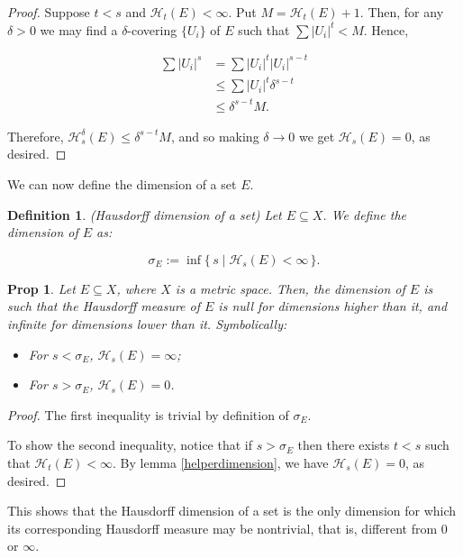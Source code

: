 \documentclass[11pt, reqno]{amsart}
\newcommand{\HH}{\mathcal{H}}
\newtheorem{prop}{Prop}
\newtheorem{definition}{Definition}
\begin{document}
\begin{proof}
Suppose $t < s$ and $\HH_t(E) < \infty$. Put $M = \HH_t(E) + 1$. Then, for any $\delta > 0$ we may find a $\delta$-covering $\{U_i\}$ of $E$ such that $\sum \lvert U_i \rvert^t < M$. Hence, 

\begin{align*}
\sum \lvert U_i \rvert^s &= \sum \lvert U_i \rvert^t \lvert U_i \rvert^{s - t}\\
&\leq \sum \lvert U_i \rvert^t \delta^{s-t}\\
&\leq \delta^{s-t} M.
\end{align*}

Therefore, $\HH_s^\delta(E) \leq \delta^{s-t} M$, and so making $\delta \to 0$ we get $\HH_s(E) = 0$, as desired.
\end{proof}

We can now define the dimension of a set $E$.

\begin{definition} (Hausdorff dimension of a set) Let $E \subseteq X$. We define the dimension of $E$ as:

\[\sigma_E := \inf \{\, s \mid \HH_s(E) < \infty \,\}.\]
\end{definition}

\begin{prop}
Let $E \subseteq X$, where $X$ is a metric space. Then, the dimension of $E$ is such that the Hausdorff measure of $E$ is null for dimensions higher than it, and infinite for dimensions lower than it. Symbolically:

\begin{itemize}
\item For $s < \sigma_E$, $\HH_s(E) = \infty$;

\item For $s > \sigma_E$, $\HH_s(E) = 0$.
\end{itemize}

\end{prop}

\begin{proof}
The first inequality is trivial by definition of $\sigma_E$.

To show the second inequality, notice that if $s > \sigma_E$ then there exists $t < s$ such that $\HH_t(E) < \infty$. By lemma \ref{helperdimension}, we have $\HH_s(E) = 0$, as desired.
\end{proof}

This shows that the Hausdorff dimension of a set is the only dimension for which its corresponding Hausdorff measure may be nontrivial, that is, different from $0$ or $\infty$.
\end{document}
